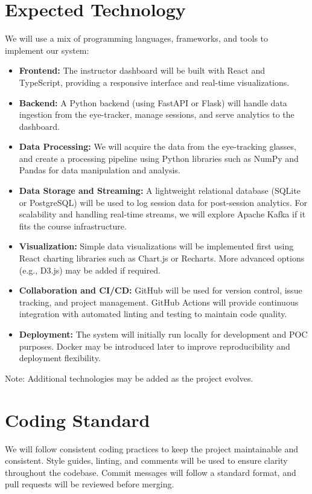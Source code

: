 \documentclass{article}
\begin{document}
\section{Expected Technology}

We will use a mix of programming languages, frameworks, and tools to implement our system:

\begin{itemize}
  \item \textbf{Frontend:} The instructor dashboard will be built with React and
  TypeScript, providing a responsive interface and real-time visualizations.
  \item \textbf{Backend:} A Python backend (using FastAPI or Flask) will handle
  data ingestion from the eye-tracker, manage sessions, and serve analytics to
  the dashboard.
  \item \textbf{Data Processing:} We will acquire the data from the eye-tracking glasses, and create a processing pipeline using Python libraries such as NumPy and Pandas for data manipulation and analysis.
  \item \textbf{Data Storage and Streaming:} A lightweight relational database (SQLite or PostgreSQL) will be used to log session data for post-session analytics. For scalability and handling real-time streams, we will explore Apache Kafka if it fits the course infrastructure.
  \item \textbf{Visualization:} Simple data visualizations will be implemented first using React charting libraries such as Chart.js or Recharts. More advanced options (e.g., D3.js) may be added if required.
  \item \textbf{Collaboration and CI/CD:} GitHub will be used for version control, issue tracking, and project management. GitHub Actions will provide continuous integration with automated linting and testing to maintain code quality.
  \item \textbf{Deployment:} The system will initially run locally for development and POC purposes. Docker may be introduced later to improve reproducibility and deployment flexibility.
\end{itemize}

Note: Additional technologies may be added as the project evolves.
\section{Coding Standard}

We will follow consistent coding practices to keep the project maintainable and consistent. Style guides, linting, and comments will be used to ensure clarity throughout the codebase. Commit messages will follow a standard format, and pull requests will be reviewed before merging.
\end{document}
